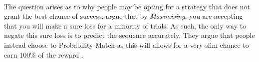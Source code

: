 \documentclass[12pt]{article}
\begin{document}
\paragraph{} The question arises as to why people may be opting for a strategy that does not grant the best chance of success. \cite{Gao2015} argue that by \textit{Maximising}, you are accepting that you will make a sure loss for a minority of trials. As such, the only way to negate this sure loss is to predict the sequence accurately. They argue that people instead choose to Probability Match as this will allows for a very slim chance to earn 100\% of the reward \citep{Gao2015}. 


\end{document}
